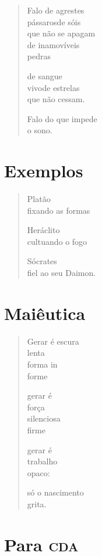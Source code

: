 \begin{verse}
Falo de agrestes\\
pássaros\qquad\qquad de sóis\\
\qquad que não se apagam\\
\qquad de inamovíveis\\
\qquad pedras

\qquad de sangue\\
\qquad vivo\qquad\qquad de estrelas\\
\qquad que não cessam.

\qquad Falo do que impede\\
\qquad o sono.
\end{verse}

\chapter{Exemplos}

\begin{verse}
Platão\\
fixando as formas

Heráclito\\
cultuando o fogo

Sócrates\\
fiel ao seu Daimon.
\end{verse}

\chapter{Maiêutica}

\begin{verse}
Gerar é escura\\
lenta\\
forma in\\
\qquad\qquad forme

gerar é\\
força\\
silenciosa\\
firme

gerar é\\
trabalho\\
opaco:

só o nascimento\\
grita.
\end{verse}

\chapter{Para \textsc{cda}}


